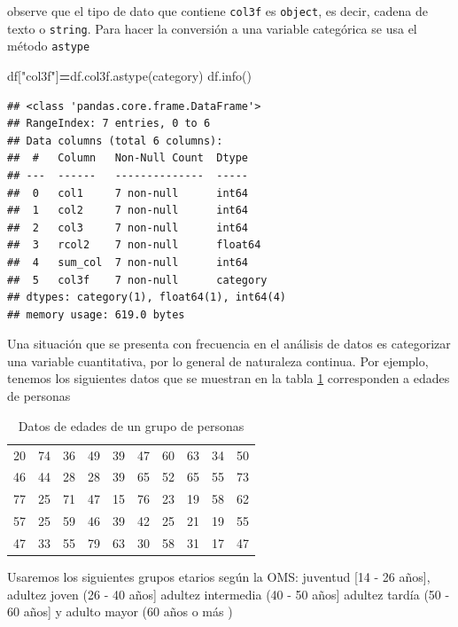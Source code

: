 \documentclass[
]{book}
\newenvironment{Shaded}{\begin{snugshade}}{\end{snugshade}}
\newcommand{\NormalTok}[1]{#1}
\newcommand{\OperatorTok}[1]{\textcolor[rgb]{0.81,0.36,0.00}{\textbf{#1}}}
\newcommand{\StringTok}[1]{\textcolor[rgb]{0.31,0.60,0.02}{#1}}
\theoremstyle{definition}
\theoremstyle{definition}
\theoremstyle{definition}
\theoremstyle{definition}
\theoremstyle{remark}
\begin{document}
observe que el tipo de dato que contiene \texttt{col3f} es \texttt{object}, es decir, cadena de texto o \texttt{string}. Para hacer la conversión a una variable categórica se usa el método \texttt{astype}

\begin{Shaded}
\begin{Highlighting}[]
\NormalTok{df[}\StringTok{"col3f"}\NormalTok{]}\OperatorTok{=}\NormalTok{df.col3f.astype(}\StringTok{\textquotesingle{}category\textquotesingle{}}\NormalTok{)}
\NormalTok{df.info()}
\end{Highlighting}
\end{Shaded}

\begin{verbatim}
## <class 'pandas.core.frame.DataFrame'>
## RangeIndex: 7 entries, 0 to 6
## Data columns (total 6 columns):
##  #   Column   Non-Null Count  Dtype   
## ---  ------   --------------  -----   
##  0   col1     7 non-null      int64   
##  1   col2     7 non-null      int64   
##  2   col3     7 non-null      int64   
##  3   rcol2    7 non-null      float64 
##  4   sum_col  7 non-null      int64   
##  5   col3f    7 non-null      category
## dtypes: category(1), float64(1), int64(4)
## memory usage: 619.0 bytes
\end{verbatim}

Una situación que se presenta con frecuencia en el análisis de datos es categorizar una variable cuantitativa, por lo general de naturaleza continua. Por ejemplo, tenemos los siguientes datos que se muestran en la tabla \ref{tab:datosedades} corresponden a edades de personas

\begin{table}

\caption{\label{tab:datosedades}Datos de edades de un grupo de personas}
\centering
\begin{tabular}[t]{rrrrrrrrrr}
\toprule
20 & 74 & 36 & 49 & 39 & 47 & 60 & 63 & 34 & 50\\
46 & 44 & 28 & 28 & 39 & 65 & 52 & 65 & 55 & 73\\
77 & 25 & 71 & 47 & 15 & 76 & 23 & 19 & 58 & 62\\
57 & 25 & 59 & 46 & 39 & 42 & 25 & 21 & 19 & 55\\
47 & 33 & 55 & 79 & 63 & 30 & 58 & 31 & 17 & 47\\
\bottomrule
\end{tabular}
\end{table}

Usaremos los siguientes grupos etarios según la OMS: juventud {[}14 - 26 años{]}, adultez joven (26 - 40 años{]} adultez intermedia (40 - 50 años{]} adultez tardía (50 - 60 años{]} y adulto mayor (60 años o más )
\end{document}
